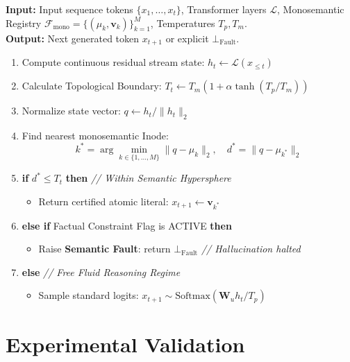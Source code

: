 \documentclass[10pt,twocolumn]{article}
\theoremstyle{definition}
\begin{document}
\begin{tcolorbox}[title={\small \textbf{Algorithm 1: HySA Forward Execution and Metric Verification}\label{alg:hysa_decoding}}]
\footnotesize
\textbf{Input:} Input sequence tokens $\{x_1, \dots, x_t\}$, Transformer layers $\mathcal{L}$, Monosemantic Registry $\mathcal{F}_{\mathrm{mono}} = \{(\mu_k, \mathbf{v}_k)\}_{k=1}^M$, Temperatures $T_p, T_m$. \\
\textbf{Output:} Next generated token $x_{t+1}$ or explicit $\bot_{\mathrm{Fault}}$.
\begin{enumerate}[leftmargin=*, itemsep=1.0pt, topsep=1.0pt]
    \item Compute continuous residual stream state: $h_t \leftarrow \mathcal{L}(x_{\le t})$
    \item Calculate Topological Boundary: $T_t \leftarrow T_m \left( 1 + \alpha \tanh(T_p / T_m) \right)$
    \item Normalize state vector: $q \leftarrow h_t / \|h_t\|_2$
    \item Find nearest monosemantic Inode:
    \[
    k^* = \arg\min_{k \in \{1, \dots, M\}} \|q - \mu_k\|_2, \quad d^* = \|q - \mu_{k^*}\|_2
    \]
    \item \textbf{if} $d^* \le T_t$ \textbf{then} \hfill \textit{// Within Semantic Hypersphere}
    \begin{itemize}[leftmargin=12pt, itemsep=0.5pt]
        \item Return certified atomic literal: $x_{t+1} \leftarrow \mathbf{v}_{k^*}$
    \end{itemize}
    \item \textbf{else if} Factual Constraint Flag is ACTIVE \textbf{then}
    \begin{itemize}[leftmargin=12pt, itemsep=0.5pt]
        \item Raise \textbf{Semantic Fault}: return $\bot_{\mathrm{Fault}}$ \hfill \textit{// Hallucination halted}
    \end{itemize}
    \item \textbf{else} \hfill \textit{// Free Fluid Reasoning Regime}
    \begin{itemize}[leftmargin=12pt, itemsep=0.5pt]
        \item Sample standard logits: $x_{t+1} \sim \mathrm{Softmax}(\mathbf{W}_u h_t / T_p)$
    \end{itemize}
\end{enumerate}
\end{tcolorbox}

\section{Experimental Validation}
\end{document}
